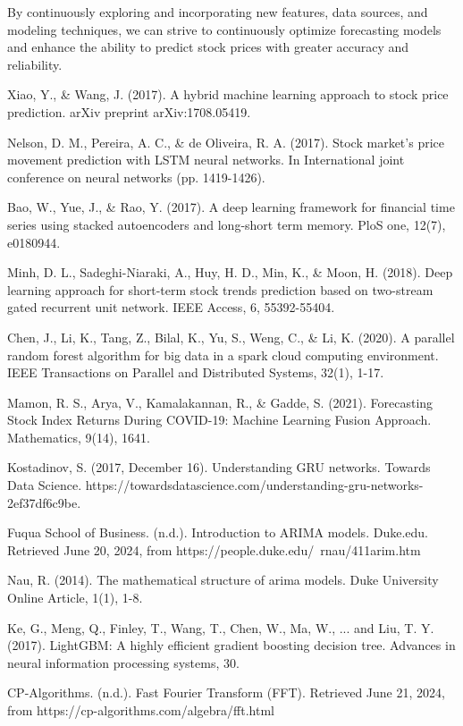 \documentclass{ieeeojies}
\begin{document}
By continuously exploring and incorporating new features, data sources, and modeling techniques, we can strive to continuously optimize forecasting models and enhance the ability to predict stock prices with greater accuracy and reliability.
\begin{thebibliography}{00}
 Xiao, Y., \& Wang, J. (2017). A hybrid machine learning approach to stock price prediction. arXiv preprint arXiv:1708.05419.

 Nelson, D. M., Pereira, A. C., \& de Oliveira, R. A. (2017). Stock market's price movement prediction with LSTM neural networks. In International joint conference on neural networks (pp. 1419-1426).

 Bao, W., Yue, J., \& Rao, Y. (2017). A deep learning framework for financial time series using stacked autoencoders and long-short term memory. PloS one, 12(7), e0180944.

 Minh, D. L., Sadeghi-Niaraki, A., Huy, H. D., Min, K., \& Moon, H. (2018). Deep learning approach for short-term stock trends prediction based on two-stream gated recurrent unit network. IEEE Access, 6, 55392-55404.

 Chen, J., Li, K., Tang, Z., Bilal, K., Yu, S., Weng, C., \& Li, K. (2020). A parallel random forest algorithm for big data in a spark cloud computing environment. IEEE Transactions on Parallel and Distributed Systems, 32(1), 1-17.

 Mamon, R. S., Arya, V., Kamalakannan, R., \& Gadde, S. (2021). Forecasting Stock Index Returns During COVID-19: Machine Learning Fusion Approach. Mathematics, 9(14), 1641.

 Kostadinov, S. (2017, December 16). Understanding GRU networks. Towards Data Science. https://towardsdatascience.com/understanding-gru-networks-2ef37df6c9be.

 Fuqua School of Business. (n.d.). Introduction to ARIMA models. Duke.edu. Retrieved June 20, 2024, from https://people.duke.edu/~rnau/411arim.htm

 Nau, R. (2014). The mathematical structure of arima models. Duke University Online Article, 1(1), 1-8.

 Ke, G., Meng, Q., Finley, T., Wang, T., Chen, W., Ma, W., ... and Liu, T. Y. (2017). LightGBM: A highly efficient gradient boosting decision tree. Advances in neural information processing systems, 30.

 CP-Algorithms. (n.d.). Fast Fourier Transform (FFT). Retrieved June 21, 2024, from https://cp-algorithms.com/algebra/fft.html



\end{thebibliography}


\EOD
\end{document}
